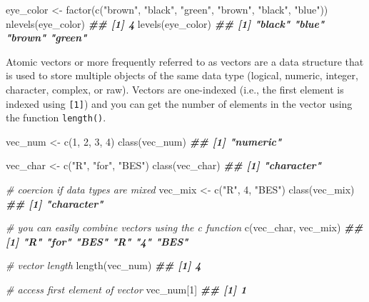 \documentclass[
]{book}
\newenvironment{Shaded}{\begin{snugshade}}{\end{snugshade}}
\newcommand{\CommentTok}[1]{\textcolor[rgb]{0.56,0.35,0.01}{\textit{#1}}}
\newcommand{\DecValTok}[1]{\textcolor[rgb]{0.00,0.00,0.81}{#1}}
\newcommand{\DocumentationTok}[1]{\textcolor[rgb]{0.56,0.35,0.01}{\textbf{\textit{#1}}}}
\newcommand{\FunctionTok}[1]{\textcolor[rgb]{0.00,0.00,0.00}{#1}}
\newcommand{\NormalTok}[1]{#1}
\newcommand{\OtherTok}[1]{\textcolor[rgb]{0.56,0.35,0.01}{#1}}
\newcommand{\StringTok}[1]{\textcolor[rgb]{0.31,0.60,0.02}{#1}}
\begin{document}
\begin{Shaded}
\begin{Highlighting}[]
\NormalTok{eye\_color }\OtherTok{\textless{}{-}} \FunctionTok{factor}\NormalTok{(}\FunctionTok{c}\NormalTok{(}\StringTok{"brown"}\NormalTok{, }\StringTok{"black"}\NormalTok{, }\StringTok{"green"}\NormalTok{, }\StringTok{"brown"}\NormalTok{, }\StringTok{"black"}\NormalTok{, }\StringTok{"blue"}\NormalTok{))}
\FunctionTok{nlevels}\NormalTok{(eye\_color)}
\DocumentationTok{\#\# [1] 4}
\FunctionTok{levels}\NormalTok{(eye\_color)}
\DocumentationTok{\#\# [1] "black" "blue"  "brown" "green"}
\end{Highlighting}
\end{Shaded}

Atomic vectors or more frequently referred to as vectors are a data structure that is used to store multiple objects of the same data type (logical, numeric, integer, character, complex, or raw). Vectors are one-indexed (i.e., the first element is indexed using \texttt{{[}1{]}}) and you can get the number of elements in the vector using the function \texttt{length()}.

\begin{Shaded}
\begin{Highlighting}[]
\NormalTok{vec\_num }\OtherTok{\textless{}{-}} \FunctionTok{c}\NormalTok{(}\DecValTok{1}\NormalTok{, }\DecValTok{2}\NormalTok{, }\DecValTok{3}\NormalTok{, }\DecValTok{4}\NormalTok{)}
\FunctionTok{class}\NormalTok{(vec\_num)}
\DocumentationTok{\#\# [1] "numeric"}

\NormalTok{vec\_char }\OtherTok{\textless{}{-}} \FunctionTok{c}\NormalTok{(}\StringTok{"R"}\NormalTok{, }\StringTok{"for"}\NormalTok{, }\StringTok{"BES"}\NormalTok{)}
\FunctionTok{class}\NormalTok{(vec\_char)}
\DocumentationTok{\#\# [1] "character"}

\CommentTok{\# coercion if data types are mixed}
\NormalTok{vec\_mix }\OtherTok{\textless{}{-}} \FunctionTok{c}\NormalTok{(}\StringTok{"R"}\NormalTok{, }\DecValTok{4}\NormalTok{, }\StringTok{"BES"}\NormalTok{)}
\FunctionTok{class}\NormalTok{(vec\_mix)}
\DocumentationTok{\#\# [1] "character"}

\CommentTok{\# you can easily combine vectors using the c function}
\FunctionTok{c}\NormalTok{(vec\_char, vec\_mix)}
\DocumentationTok{\#\# [1] "R"   "for" "BES" "R"   "4"   "BES"}

\CommentTok{\# vector length}
\FunctionTok{length}\NormalTok{(vec\_num)}
\DocumentationTok{\#\# [1] 4}

\CommentTok{\# access first element of vector}
\NormalTok{vec\_num[}\DecValTok{1}\NormalTok{]}
\DocumentationTok{\#\# [1] 1}
\end{Highlighting}
\end{Shaded}
\end{document}
